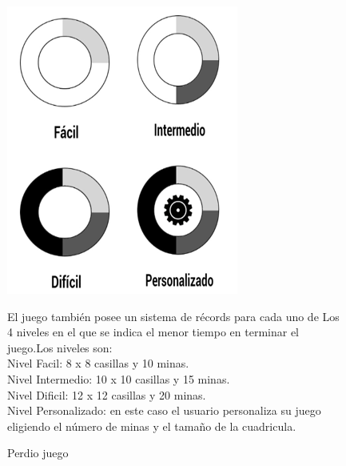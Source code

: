 \begin{figure}[htbp]
\begin{center}
\includegraphics[width=.50\textwidth]{./imagenes/Niveles.png}
\caption{Perdio juego}
\end{center}
El juego también posee un sistema de récords para cada uno de Los 4 niveles en el que se indica el menor tiempo en terminar el juego.Los niveles son:
\\Nivel Facil: 8 x 8 casillas y 10 minas.
\\Nivel Intermedio: 10 x 10 casillas y 15 minas.
\\Nivel Dificil: 12 x 12 casillas y 20 minas.
\\Nivel Personalizado: en este caso el usuario personaliza su juego eligiendo el número de minas y el tamaño de la cuadricula.
\end{figure}
